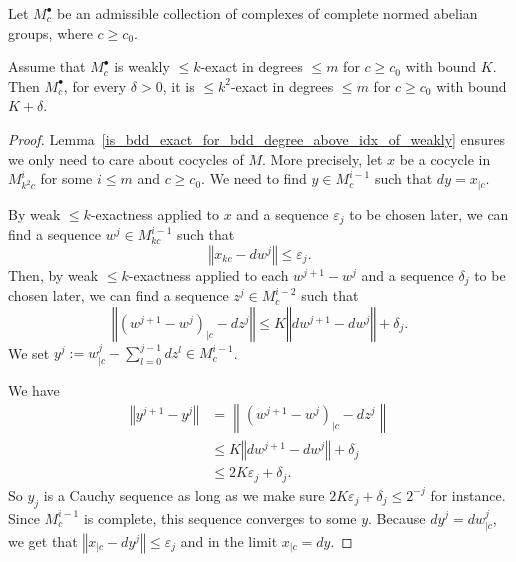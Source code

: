 \begin{lemma}
  \label{weakexact_implies_exact}
  Let $M^\bullet_c$ be an admissible collection
  of complexes of complete normed abelian groups, where $c\geq c_0$.

  Assume that $M^\bullet_c$ is weakly $\leq k$-exact in degrees $\leq m$ for $c\geq c_0$ with bound $K$.
  Then $M^\bullet_c$, for every $δ > 0$, it is $\leq k^2$-exact in degrees $\leq m$ for $c\geq c_0$
  with bound $K+δ$.
\end{lemma}
\begin{proof}
  Lemma~\ref{is_bdd_exact_for_bdd_degree_above_idx_of_weakly} ensures we only need to care about cocycles
  of $M$. More precisely, let $x$ be a cocycle in $M^i_{k^2c}$ for some $i ≤ m$ and $c ≥ c_0$.
  We need to find $y \in M^{i-1}_c$ such that $dy = x_{|c}$.

  By weak $\leq k$-exactness applied to $x$ and a sequence $ε_j$ to be chosen later, we can find
  a sequence $w^j \in M^{i-1}_{kc}$ such that
  \[
    ‖x_{kc} - dw^j‖ ≤ ε_j.
  \]
  Then, by weak $\leq k$-exactness applied to each $w^{j + 1} - w^j$ and a sequence $δ_j$ to be chosen later, we can find
  a sequence $z^j \in M^{i-2}_{c}$ such that
  \[
    ‖(w^{j+1} - w^j)_{|c} - dz^j‖ ≤ K‖dw^{j+1} - dw^j‖ + δ_j.
  \]
  We set $y^j := w^j_{|c} - \sum_{l=0}^{j-1} dz^l ∈ M^{i-1}_c$.


  We have
  \begin{align*}
    ‖y^{j + 1} - y^j‖ &=  \left\|(w^{j + 1} - w^j)_{|c} - dz^j\right\| \\
                      &≤  K‖dw^{j+1} - dw^j‖ + δ_j \\
                      &≤  2Kε_j + δ_j.
  \end{align*}
  So $y_j$ is a Cauchy sequence as long as we make sure $2Kε_j + δ_j ≤ 2^{-j}$ for instance.
  Since $M^{i-1}_c$ is complete, this sequence converges to some $y$.
  Because $dy^j = dw^j_{|c}$, we get that $‖x_{|c} - dy^j‖ ≤ ε_j$ and in the limit $x_{|c} = dy$.
\end{proof}

